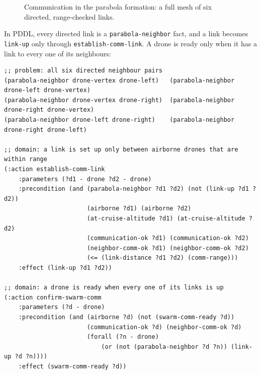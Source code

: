 \documentclass[11pt,a4paper,oneside]{report}
\newcommand{\code}[1]{\texttt{#1}}
\begin{document}
\begin{figure}[H]
\centering
{}
\caption[Communication in the parabola formation]{Communication in the parabola formation: a full
mesh of six directed, range-checked links.}
\label{fig:comm-parabola}
\end{figure}

\noindent In PDDL, every directed link is a \code{parabola-neighbor} fact, and a link becomes
\code{link-up} only through \code{establish-comm-link}. A drone is ready only when it has a link
to every one of its neighbours:

\begin{lstlisting}
;; problem: all six directed neighbour pairs
(parabola-neighbor drone-vertex drone-left)   (parabola-neighbor drone-left drone-vertex)
(parabola-neighbor drone-vertex drone-right)  (parabola-neighbor drone-right drone-vertex)
(parabola-neighbor drone-left drone-right)    (parabola-neighbor drone-right drone-left)

;; domain: a link is set up only between airborne drones that are within range
(:action establish-comm-link
    :parameters (?d1 - drone ?d2 - drone)
    :precondition (and (parabola-neighbor ?d1 ?d2) (not (link-up ?d1 ?d2))
                       (airborne ?d1) (airborne ?d2)
                       (at-cruise-altitude ?d1) (at-cruise-altitude ?d2)
                       (communication-ok ?d1) (communication-ok ?d2)
                       (neighbor-comm-ok ?d1) (neighbor-comm-ok ?d2)
                       (<= (link-distance ?d1 ?d2) (comm-range)))
    :effect (link-up ?d1 ?d2))

;; domain: a drone is ready when every one of its links is up
(:action confirm-swarm-comm
    :parameters (?d - drone)
    :precondition (and (airborne ?d) (not (swarm-comm-ready ?d))
                       (communication-ok ?d) (neighbor-comm-ok ?d)
                       (forall (?n - drone)
                           (or (not (parabola-neighbor ?d ?n)) (link-up ?d ?n))))
    :effect (swarm-comm-ready ?d))
\end{lstlisting}
\end{document}
